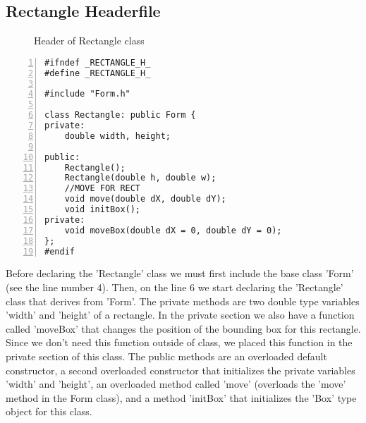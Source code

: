 \documentclass{article}
\begin{document}
\subsection{Rectangle Headerfile}
\begin{figure}
\scriptsize{\caption{Header of Rectangle class}}
\end{figure}
\begin{lstlisting}[basicstyle=\footnotesize\ttfamily, numbers=left, stepnumber=1, numberstyle = \normalsize, caption={My Caption}]
#ifndef _RECTANGLE_H_
#define _RECTANGLE_H_

#include "Form.h"

class Rectangle: public Form {
private:
	double width, height;

public:
	Rectangle();
	Rectangle(double h, double w);
	//MOVE FOR RECT
	void move(double dX, double dY);
	void initBox();
private:
	void moveBox(double dX = 0, double dY = 0);
};
#endif
\end{lstlisting}
\normalsize{Before declaring the 'Rectangle' class we must first include the base class 'Form' (see the line number 4). Then, on the line 6 we start declaring the 'Rectangle' class that derives from 'Form'.
The private methods are two double type variables 'width' and 'height' of a rectangle. In the private section we also have a function called 'moveBox' that changes the position of the bounding box for this rectangle. Since we don't need this function outside of class, we placed this function in the private section of this class.
The public methods are an overloaded default constructor, a second overloaded constructor that initializes the private variables 'width' and 'height', an overloaded method called 'move' (overloads the 'move' method in the Form class), and a method 'initBox' that initializes the 'Box' type object for this class.

}\newpage
\end{document}

